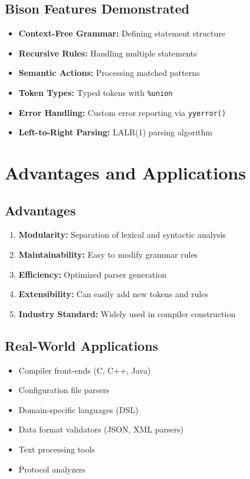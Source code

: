 \documentclass[12pt,a4paper]{article}
\begin{document}
\subsection{Bison Features Demonstrated}
\begin{itemize}
    \item \textbf{Context-Free Grammar:} Defining statement structure
    \item \textbf{Recursive Rules:} Handling multiple statements
    \item \textbf{Semantic Actions:} Processing matched patterns
    \item \textbf{Token Types:} Typed tokens with \texttt{\%union}
    \item \textbf{Error Handling:} Custom error reporting via \texttt{yyerror()}
    \item \textbf{Left-to-Right Parsing:} LALR(1) parsing algorithm
\end{itemize}

\section{Advantages and Applications}

\subsection{Advantages}
\begin{enumerate}
    \item \textbf{Modularity:} Separation of lexical and syntactic analysis
    \item \textbf{Maintainability:} Easy to modify grammar rules
    \item \textbf{Efficiency:} Optimized parser generation
    \item \textbf{Extensibility:} Can easily add new tokens and rules
    \item \textbf{Industry Standard:} Widely used in compiler construction
\end{enumerate}

\subsection{Real-World Applications}
\begin{itemize}
    \item Compiler front-ends (C, C++, Java)
    \item Configuration file parsers
    \item Domain-specific languages (DSL)
    \item Data format validators (JSON, XML parsers)
    \item Text processing tools
    \item Protocol analyzers
\end{itemize}
\end{document}
